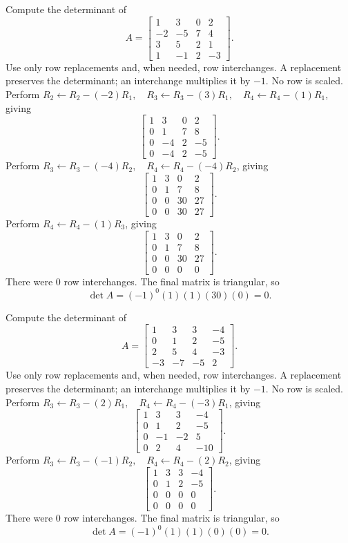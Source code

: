 \goal Compute the determinant of
\[A=\begin{bmatrix}1&3&0&2\\-2&-5&7&4\\3&5&2&1\\1&-1&2&-3\end{bmatrix}.\]
Use only row replacements and, when needed, row interchanges. A replacement preserves the determinant; an interchange multiplies it by $-1$. No row is scaled.
Perform $R_2\leftarrow R_2-(-2)R_1,\quad R_3\leftarrow R_3-(3)R_1,\quad R_4\leftarrow R_4-(1)R_1$, giving
\[
\begin{bmatrix}1&3&0&2\\0&1&7&8\\0&-4&2&-5\\0&-4&2&-5\end{bmatrix}.
\]
Perform $R_3\leftarrow R_3-(-4)R_2,\quad R_4\leftarrow R_4-(-4)R_2$, giving
\[
\begin{bmatrix}1&3&0&2\\0&1&7&8\\0&0&30&27\\0&0&30&27\end{bmatrix}.
\]
Perform $R_4\leftarrow R_4-(1)R_3$, giving
\[
\begin{bmatrix}1&3&0&2\\0&1&7&8\\0&0&30&27\\0&0&0&0\end{bmatrix}.
\]
There were $0$ row interchanges. The final matrix is triangular, so
\[\det A=(-1)^{0}(1)(1)(30)(0)=0.\]


\goal Compute the determinant of
\[A=\begin{bmatrix}1&3&3&-4\\0&1&2&-5\\2&5&4&-3\\-3&-7&-5&2\end{bmatrix}.\]
Use only row replacements and, when needed, row interchanges. A replacement preserves the determinant; an interchange multiplies it by $-1$. No row is scaled.
Perform $R_3\leftarrow R_3-(2)R_1,\quad R_4\leftarrow R_4-(-3)R_1$, giving
\[
\begin{bmatrix}1&3&3&-4\\0&1&2&-5\\0&-1&-2&5\\0&2&4&-10\end{bmatrix}.
\]
Perform $R_3\leftarrow R_3-(-1)R_2,\quad R_4\leftarrow R_4-(2)R_2$, giving
\[
\begin{bmatrix}1&3&3&-4\\0&1&2&-5\\0&0&0&0\\0&0&0&0\end{bmatrix}.
\]
There were $0$ row interchanges. The final matrix is triangular, so
\[\det A=(-1)^{0}(1)(1)(0)(0)=0.\]



